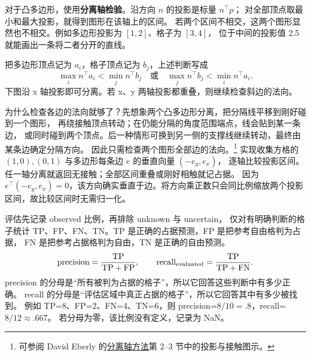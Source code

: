 对于凸多边形，使用\textbf{分离轴检验}。沿方向 $n$ 的投影是标量 $n^\top p$；
对全部顶点取最小和最大投影，就得到图形在该轴上的区间。
若两个区间不相交，这两个图形显然也不相交。例如多边形投影为 $[1,2]$、格子为 $[3,4]$，
位于中间的投影值 2.5 就能画出一条将二者分开的直线。

把多边形顶点记为 $a_i$，格子顶点记为 $b_j$，上述判断写成
\[
\max_i n^\top a_i < \min_j n^\top b_j
\quad\text{或}\quad
\max_j n^\top b_j < \min_i n^\top a_i.
\]
下图沿 x 轴投影即可分离。若 x、y 两轴投影都重叠，则继续检查斜边的法向。
\begin{center}
\end{center}

为什么检查各边的法向就够了？先想象两个凸多边形分离，把分隔线平移到刚好碰到一个图形，
再绕接触顶点转动；在仍能分隔的角度范围端点，线会贴到某一条边，
或同时碰到两个顶点。后一种情形可换到另一侧的支撑线继续转动，最终由某条边确定分隔方向。
因此只需检查两个图形全部边的法向。\footnote{可参阅 David Eberly 的\href{https://www.geometrictools.com/Documentation/MethodOfSeparatingAxes.pdf}{分离轴方法}第 2--3 节中的投影与接触图示。}
实现收集方格的 $(1,0),(0,1)$ 与多边形每条边 $e$ 的垂直向量 $(-e_y,e_x)$，
逐轴比较投影区间。任一轴分离就返回无接触；全部区间重叠或刚好相触就记占据。
因为 $e^\top(-e_y,e_x)=0$，该方向确实垂直于边。将方向乘正数只会同比例缩放两个投影区间，故比较区间时无需归一化。

评估先记录 observed 比例，再排除 unknown 与 uncertain，
仅对有明确判断的格子统计 TP、FP、FN、TN。TP 是正确的占据预测，FP 是把参考自由格判为占据，
FN 是把参考占据格判为自由，TN 是正确的自由预测。
\begin{equation}
 {\rm precision}=\frac{\rm TP}{\rm TP+FP},\qquad
 {\rm recall}_{\rm evaluated}=\frac{\rm TP}{\rm TP+FN}.
\end{equation}
precision 的分母是“所有被判为占据的格子”，所以它回答这些判断中有多少正确。
recall 的分母是“评估区域中真正占据的格子”，所以它回答其中有多少被找到。
例如 TP=8、FP=2、FN=4、TN=6，则 precision=$8/10=.8$，recall=$8/12\approx.667$。
若分母为零，该比例没有定义，记录为 NaN。

